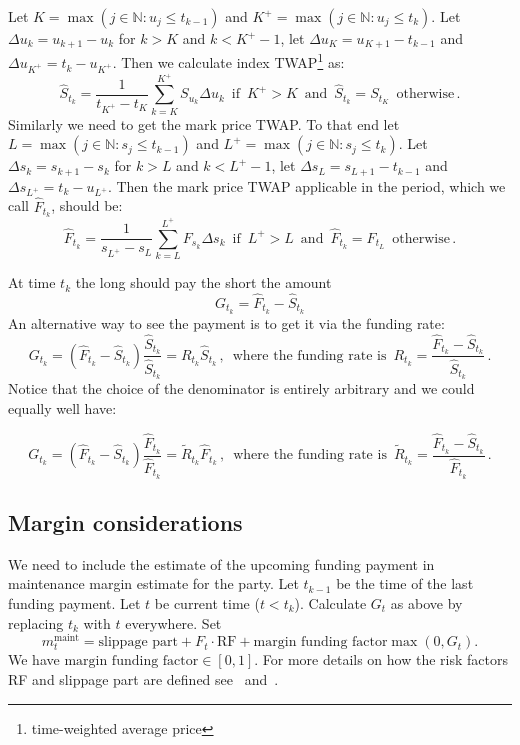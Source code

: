 \documentclass[10pt]{article}
\begin{document}
Let $K=\max(j\in \mathbb N : u_j \leq t_{k-1})$ and 
$K^+ = \max(j\in \mathbb N : u_j \leq t_k)$. Let $\Delta u_k = u_{k+1} - u_{k}$ for $k > K$ and $k < K^{+}-1$, let $\Delta u_{K} = u_{K+1} - t_{k-1}$ and $\Delta u_{K^+} = t_k - u_{K^+}$. Then we calculate index TWAP\footnote{time-weighted average price} as:
\[
\hat S_{t_k} = \frac1{t_{K^+} - t_{K}}\sum_{k=K}^{K^+} S_{u_k} \Delta u_k\,\,\,\text{if}\,\,\, K^+ > K\,\,\, \text{and} \,\,\, \hat S_{t_k} = S_{t_K}\,\,\, \text{otherwise}\,.    
\]
Similarly we need to get the mark price TWAP. 
To that end let $L = \max(j\in \mathbb N : s_j \leq t_{k-1})$ and $L^+ = \max(j\in \mathbb N : s_j \leq t_k)$. 
Let $\Delta s_k = s_{k+1} - s_{k}$ for $k > L$ and $k < L^{+}-1$, let $\Delta s_L=s_{L+1}-t_{k-1}$ and $\Delta s_{L^+}=t_k-u_{L^+}$. 
Then the mark price TWAP applicable in the period, which we call $\hat F_{t_k}$, should be:
\[
\hat F_{t_k} = \frac1{s_{L^+} - s_L}\sum_{k=L}^{L^+} F_{s_k} \Delta s_k\,\,\,\text{if}\,\,\, L^+ > L\,\,\, \text{and} \,\,\, \hat F_{t_k} = F_{t_L}\,\,\, \text{otherwise}\,.    
\]
 
At time $t_k$ the long should pay the short the amount
\[
G_{t_k} = \hat F_{t_k} - \hat S_{t_k}   
\]
An alternative way to see the payment is to get it via the funding rate:
\[
G_{t_k} = (\hat F_{t_k} - \hat S_{t_k})\frac{\hat S_{t_k}}{\hat S_{t_k}} = R_{t_k} \hat S_{t_k}\,,\,\,\,\text{where the funding rate is}\,\,\, R_{t_k} = \frac{\hat F_{t_k} - \hat S_{t_k}}{\hat S_{t_k}}\,.
\]
Notice that the choice of the denominator is entirely arbitrary and we could equally well have:

\[
G_{t_k} = (\hat F_{t_k} - \hat S_{t_k})\frac{\hat F_{t_k}}{\hat F_{t_k}} = \tilde R_{t_k} \hat F_{t_k}\,,\,\,\,\text{where the funding rate is}\,\,\, \tilde R_{t_k} = \frac{\hat F_{t_k} - \hat S_{t_k}}{\hat F_{t_k}}\,.
\]


\subsection{Margin considerations}
\label{sec:funding_in_maintenance}
We need to include the estimate of the upcoming funding payment in maintenance margin estimate for the party. 
Let $t_{k-1}$ be the time of the last funding payment. Let $t$ be current time ($t<t_k$). 
Calculate $G_t$ as above by replacing $t_k$ with $t$ everywhere. 
Set 
\[
m^{\text{maint}}_t = \text{slippage part} + F_t \cdot \text{RF} + \text{margin funding factor}\max(0,G_t).    
\]
We have $\text{margin funding factor} \in [0,1]$.
For more details on how the risk factors RF and slippage part are defined see~\cite{margins paper} and~\cite{margins spec}.
\end{document}
